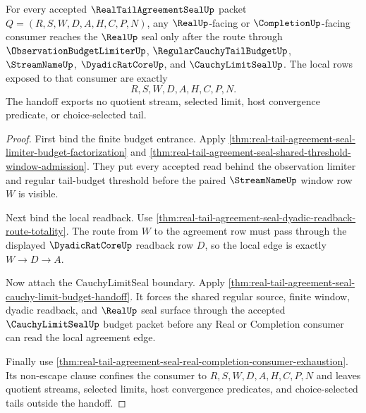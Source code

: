 \begin{theorem}
\label{thm:real-tail-agreement-seal-budget-real-handoff}
For every accepted $\RealTailAgreementSealUp$ packet $Q=(R,S,W,D,A,H,C,P,N)$, any $\RealUp$-facing or $\CompletionUp$-facing consumer reaches the $\RealUp$ seal only after the route through $\ObservationBudgetLimiterUp$, $\RegularCauchyTailBudgetUp$, $\StreamNameUp$, $\DyadicRatCoreUp$, and $\CauchyLimitSealUp$. The local rows exposed to that consumer are exactly
$$
R,S,W,D,A,H,C,P,N.
$$
The handoff exports no quotient stream, selected limit, host convergence predicate, or choice-selected tail.
\end{theorem}
\begin{proof}
First bind the finite budget entrance. Apply \autoref{thm:real-tail-agreement-seal-limiter-budget-factorization} and \autoref{thm:real-tail-agreement-seal-shared-threshold-window-admission}. They put every accepted read behind the observation limiter and regular tail-budget threshold before the paired $\StreamNameUp$ window row $W$ is visible.

Next bind the local readback. Use \autoref{thm:real-tail-agreement-seal-dyadic-readback-route-totality}. The route from $W$ to the agreement row must pass through the displayed $\DyadicRatCoreUp$ readback row $D$, so the local edge is exactly $W \to D \to A$.

Now attach the CauchyLimitSeal boundary. Apply \autoref{thm:real-tail-agreement-seal-cauchy-limit-budget-handoff}. It forces the shared regular source, finite window, dyadic readback, and $\RealUp$ seal surface through the accepted $\CauchyLimitSealUp$ budget packet before any Real or Completion consumer can read the local agreement edge.

Finally use \autoref{thm:real-tail-agreement-seal-real-completion-consumer-exhaustion}. Its non-escape clause confines the consumer to $R,S,W,D,A,H,C,P,N$ and leaves quotient streams, selected limits, host convergence predicates, and choice-selected tails outside the handoff.
\end{proof}

